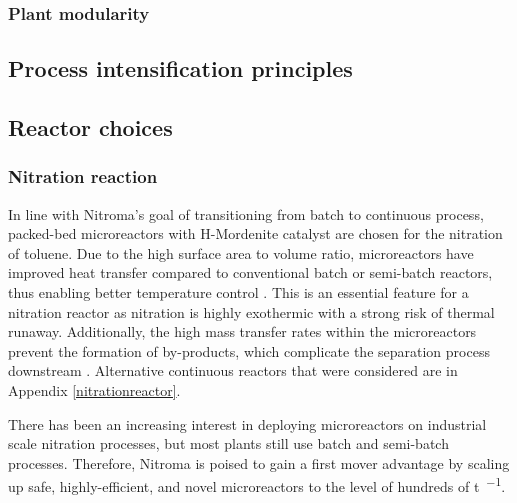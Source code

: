 


\subsubsection{Plant modularity} %

\subsection{Process intensification principles}

%
%
%

\subsection{Reactor choices}

\subsubsection{Nitration reaction}

In line with Nitroma's goal of transitioning from batch to continuous process, packed-bed microreactors with H-Mordenite catalyst are chosen for the nitration of toluene. Due to the high surface area to volume ratio, microreactors have improved heat transfer compared to conventional batch or semi-batch reactors, thus enabling better temperature control \cite{halder_nitration_2007}. This is an essential feature for a nitration reactor as nitration is highly exothermic with a strong risk of thermal runaway. Additionally, the high mass transfer rates within the microreactors prevent the formation of by-products, which complicate the separation process downstream \cite{halder_nitration_2007}.
Alternative continuous reactors that were considered are in Appendix \ref{nitrationreactor}. 

There has been an increasing interest in deploying microreactors on industrial scale nitration processes, but most plants still use batch and semi-batch processes. Therefore, Nitroma is poised to gain a first mover advantage by scaling up safe, highly-efficient, and novel microreactors to the level of hundreds of \si{\tonne\per\year}.

